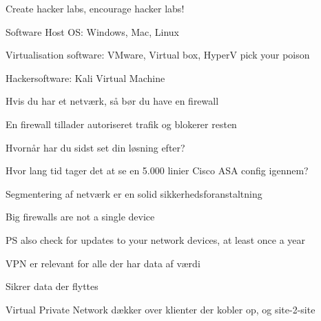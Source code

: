 \documentclass[Screen16to9,17pt]{foils}
\begin{document}


\begin{list2}
\item Create hacker labs, encourage hacker labs!
\item Software Host OS: Windows, Mac, Linux
\item Virtualisation software: VMware, Virtual box, HyperV pick your poison
\item Hackersoftware: Kali Virtual Machine 
\end{list2}





\begin{list2}
\item Hvis du har et netværk, så bør du have en firewall
\item En firewall tillader autoriseret trafik og blokerer resten
\item Hvornår har du sidst set din løsning efter?
\item Hvor lang tid tager det at se en 5.000 linier Cisco ASA config igennem?
\item Segmentering af netværk er en solid sikkerhedsforanstaltning
\end{list2}



\centerline{Big firewalls are not a single device}

PS also check for updates to your network devices, at least once a year \smiley




\begin{list2}
\item VPN er relevant for alle der har data af værdi
\item Sikrer data der flyttes
\item Virtual Private Network dækker over klienter der kobler op, og site-2-site
\end{list2}


\end{document}
